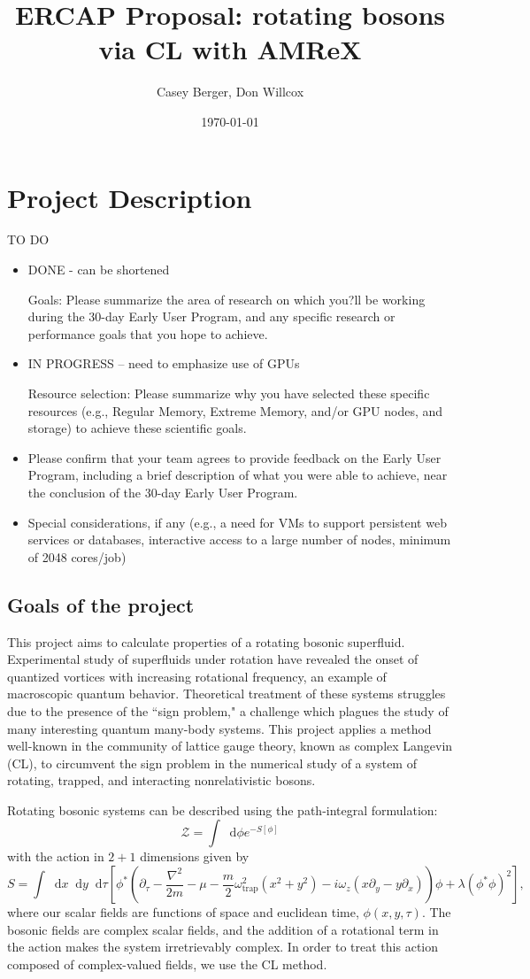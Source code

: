 \documentclass[onecolumn, 12pt]{article}
\title{ERCAP Proposal: rotating bosons via CL with AMReX}
\author{Casey Berger, Don Willcox}
\date{\today}
\newcommand{\beq}{\begin{equation}}
\newcommand{\eeq}{\end{equation}}
\def\CZ{{\mathcal Z}}
\def\del{{\nabla}}
\newcommand*\dif{\mathop{}\!\mathrm{d}}
\begin{document}
\section{Project Description}
TO DO
\begin{itemize} 
	\item DONE  - can be shortened
	
	Goals: Please summarize the area of research on which you?ll be working during the 30-day Early User Program, and any specific research or performance goals that you hope to achieve.
	
	\item IN PROGRESS -- need to emphasize use of GPUs
	
	Resource selection: Please summarize why you have selected these specific resources (e.g., Regular Memory, Extreme Memory, and/or GPU nodes, and storage) to achieve these scientific goals.
	
	\item Please confirm that your team agrees to provide feedback on the Early User Program, including a brief description of what you were able to achieve, near the conclusion of the 30-day Early User Program.
	
	\item Special considerations, if any (e.g., a need for VMs to support persistent web services or databases, interactive access to a large number of nodes, minimum of 2048 cores/job)
\end{itemize}
\subsection{Goals of the project}
This project aims to calculate properties of a rotating bosonic superfluid. Experimental study of superfluids under rotation have revealed the onset of quantized vortices with increasing rotational frequency, an example of macroscopic quantum behavior. Theoretical treatment of these systems struggles due to the presence of the ``sign problem," a challenge which plagues the study of many interesting quantum many-body systems. This project applies a method well-known in the community of lattice gauge theory, known as complex Langevin (CL), to circumvent the sign problem in the numerical study of a system of rotating, trapped, and interacting nonrelativistic bosons. 

Rotating bosonic systems can be described using the path-integral formulation:
%
\beq
\CZ = \int \dif \phi e^{-S[\phi]}
\eeq
%
with the action in $2+1$ dimensions given by
%
\beq
S = \int \dif x \dif y \dif\tau \left[ \phi^{*}\left( \partial_{\tau} - \frac{\del^{2}}{2m} - \mu  - \frac{m}{2} \omega_{\text{trap}}^{2}(x^{2}+y^{2})- i \omega_{z}(x \partial_{y} - y\partial_{x})\right)\phi + \lambda (\phi^{*} \phi)^{2}\right],
\eeq 
%
where our scalar fields are functions of space and euclidean time, $\phi(x,y,\tau)$. The bosonic fields are complex scalar fields, and the addition of a rotational term in the action makes the system irretrievably complex. In order to treat this action composed of complex-valued fields, we use the CL method.
\end{document}
